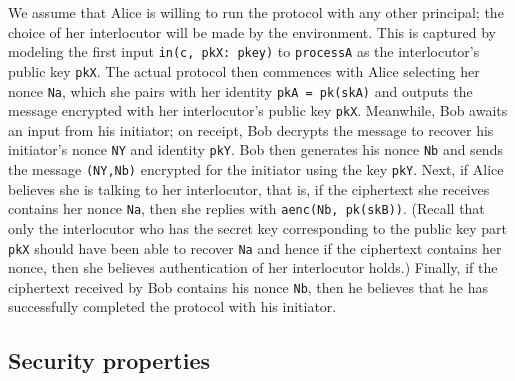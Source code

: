 \documentclass{book}
\begin{document}
We assume that Alice is willing to run the protocol with any other principal; the choice of her interlocutor will be made by the environment. This is captured by modeling the first input \lstinline!in(c, pkX: pkey)! to \lstinline!processA! as the interlocutor's public key \lstinline!pkX!. The actual protocol then commences with Alice selecting her nonce \lstinline!Na!, which she pairs with her identity \lstinline!pkA = pk(skA)! and outputs the message encrypted with her interlocutor's public key \lstinline!pkX!. Meanwhile, Bob awaits an input from his initiator; on receipt, Bob decrypts the message to recover his initiator's nonce \lstinline!NY! and identity \lstinline!pkY!. Bob then generates his nonce \lstinline!Nb! and sends the message \lstinline!(NY,Nb)! encrypted for the initiator using the key \lstinline!pkY!. Next, if Alice believes she is talking to her interlocutor, that is, if the ciphertext she receives contains her nonce \lstinline!Na!, then she replies with \lstinline!aenc(Nb, pk(skB))!. (Recall that only the interlocutor who has the secret key corresponding to the public key part \lstinline!pkX! should have been able to recover \lstinline!Na! and hence if the ciphertext contains her nonce, then she believes authentication of her interlocutor holds.) Finally, if the ciphertext received by Bob contains his nonce \lstinline!Nb!, then he believes that he has successfully completed the protocol with his initiator.

\subsection{Security properties}
\end{document}
